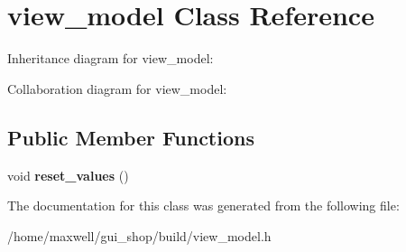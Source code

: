 \hypertarget{classview__model}{}\section{view\+\_\+model Class Reference}
\label{classview__model}


Inheritance diagram for view\+\_\+model\+:


Collaboration diagram for view\+\_\+model\+:
\subsection*{Public Member Functions}
\begin{DoxyCompactItemize}
\item 
void {\bfseries reset\+\_\+values} ()\hypertarget{classview__model_ae7f8aecbcd885a723c669ea9aa14a695}{}\label{classview__model_ae7f8aecbcd885a723c669ea9aa14a695}

\end{DoxyCompactItemize}


The documentation for this class was generated from the following file\+:\begin{DoxyCompactItemize}
\item 
/home/maxwell/gui\+\_\+shop/build/view\+\_\+model.\+h\end{DoxyCompactItemize}
